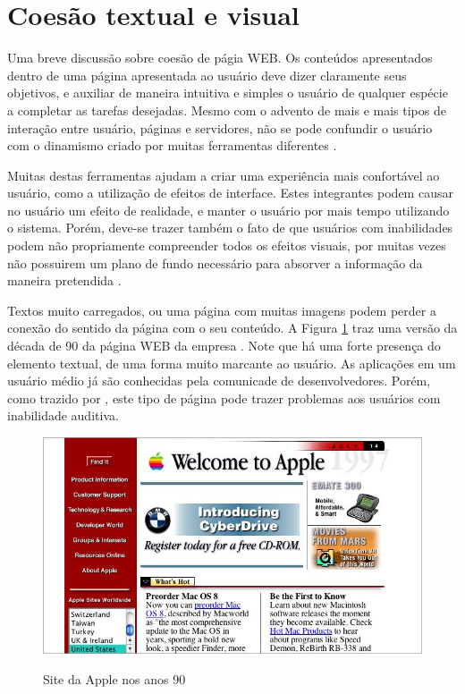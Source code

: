 \documentclass[
	12pt,				%
	oneside,			%
	a4paper,			%
	english,			%
	brazil				%
	]{abntex2ppgsi}
\begin{document}
\section{Coesão textual e visual}

Uma breve discussão sobre coesão de págia WEB. Os conteúdos apresentados dentro de uma página apresentada ao usuário deve dizer claramente seus objetivos, e auxiliar de maneira intuitiva e simples o usuário de qualquer espécie a completar as tarefas desejadas. Mesmo com o advento de mais e mais tipos de interação entre usuário, páginas e servidores, não se pode confundir o usuário com o dinamismo criado por muitas ferramentas diferentes \cite{webAcessibility}. 

Muitas destas ferramentas ajudam a criar uma experiência mais confortável ao usuário, como a utilização de efeitos de interface. Estes integrantes podem causar no usuário um efeito de realidade, e manter o usuário por mais tempo utilizando o sistema. Porém, deve-se trazer também o fato de que usuários com inabilidades podem não propriamente compreender todos os efeitos visuais, por muitas vezes não possuirem um plano de fundo necessário para absorver a informação da maneira pretendida \cite{deafPeople}.

Textos muito carregados, ou uma página com muitas imagens podem perder a conexão do sentido da página com o seu conteúdo. A Figura \ref{fig:apple} traz uma versão da década de 90 da página WEB da empresa . Note que há uma forte presença do elemento textual, de uma forma muito marcante ao usuário. As aplicações em um usuário médio já são conhecidas pela comunicade de desenvolvedores. Porém, como trazido por , este tipo de página pode trazer problemas aos usuários com inabilidade auditiva. 

\begin{figure}[htbp]
	\centering
	\caption{Site da Apple nos anos 90}
	\includegraphics[scale=0.5]{apple.jpg}
	\label{fig:apple}
\end{figure}
 
\end{document}
